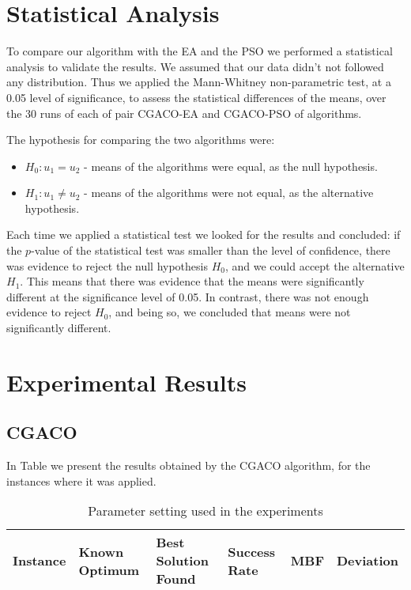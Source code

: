 \section{Statistical Analysis}
To compare our algorithm with the EA and the PSO we performed a statistical analysis to validate the results. We assumed that our data didn't not followed any distribution. Thus we applied the Mann-Whitney non-parametric test, at a 0.05 level of significance, to assess the statistical differences of the means, over the 30 runs of each of pair CGACO-EA and CGACO-PSO of algorithms.

The hypothesis for comparing the two algorithms were:
\begin{itemize}
	\item $H_{0} : u_1 = u_2$ - means of the algorithms were equal, as the null hypothesis.
	\item $H_{1} : u_1 \neq u_2$ - means of the algorithms were not equal, as the alternative hypothesis.
\end{itemize}

Each time we applied a statistical test we looked for the results and concluded: if the $p$-value of the statistical test was smaller than the level of confidence, there was evidence to reject the null hypothesis $H_{0}$, and we could accept the alternative $H_{1}$. This means that there was evidence that the means were significantly different  at the significance level of 0.05. In contrast, there was not enough evidence to reject $H_{0}$, and being so, we concluded that means were not significantly different.



\section{Experimental Results}
	\subsection{CGACO}
	In Table  we present the results obtained by the CGACO algorithm, for the instances where it was applied. 
	\begin{table}[!htbp]
		\begin{center}
			\begin{tabular}{| c | p{2cm} | p{3cm} | p{2cm} | c | c |}
				\hline
				\textbf{Instance} & \textbf{Known Optimum} & \textbf{Best Solution Found} & \textbf{Success Rate} & \textbf{MBF} & \textbf{Deviation}\\
				\hline
			\end{tabular}
		\caption{Parameter setting used in the experiments}
		\label{tab:general_settings}
		\end{center}
	\end{table}
	
	
	
	
	
	
	
	
	
	

	